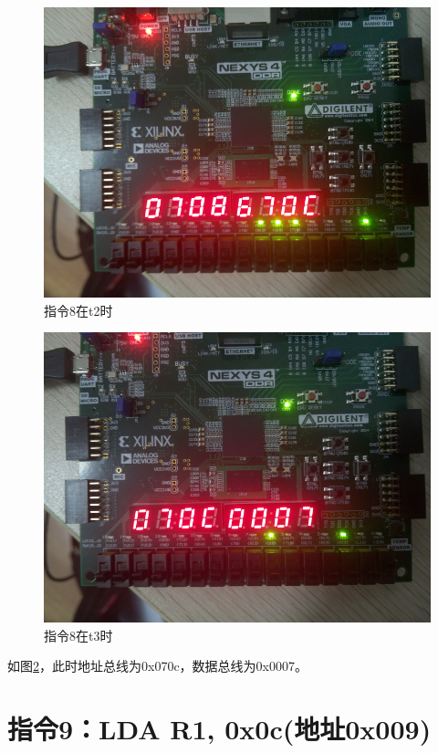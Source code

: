 \documentclass[forprint]{WHUBachelor}
\begin{document}
\begin{figure}[H]
  \centering
  \includegraphics[width=5in]{figures/download/71.jpg}
  \caption{指令8在t2时}
  \label{fig:down:71}
\end{figure}

\begin{figure}[H]
  \centering
  \includegraphics[width=5in]{figures/download/72.jpg}
  \caption{指令8在t3时}
  \label{fig:down:72}
\end{figure}

如图\ref{fig:down:72}，此时地址总线为0x070c，数据总线为0x0007。

\section{指令9：LDA R1, 0x0c(地址0x009)}
\end{document}
